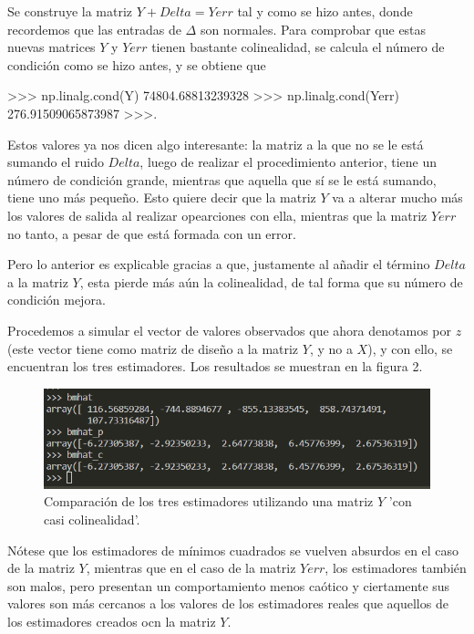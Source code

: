 \documentclass[letterpaper]{article}
\newcommand{\1}{\mathds{1}}
\theoremstyle{definition}
\theoremstyle{definition}
\theoremstyle{definition}
\theoremstyle{definition}
\theoremstyle{definition}
\begin{document}
\begin{enumerate}
\begin{enumerate}
            Se construye la matriz $Y+Delta=Yerr$ tal y como se hizo antes, donde recordemos que las entradas
            de $\Delta$ son normales. Para comprobar que estas nuevas matrices $Y$ y $Yerr$ tienen bastante colinealidad, se calcula el número
            de condición como se hizo antes, y se obtiene que
            \begin{verbatim*}
                >>> np.linalg.cond(Y)
74804.68813239328
>>> np.linalg.cond(Yerr)
276.91509065873987
>>>.
            \end{verbatim*}
            Estos valores ya nos dicen algo interesante: la matriz a la que no se le está
            sumando el ruido $Delta$, luego de realizar el procedimiento anterior, 
            tiene un número de condición grande, mientras que aquella que sí se le está sumando, 
            tiene uno más pequeño. Esto quiere decir que la matriz $Y$ va a alterar mucho más los valores
            de salida al realizar opearciones con ella, mientras que la matriz $Yerr$ no tanto, a pesar
            de que está formada con un error.
            \newline

            Pero lo anterior es explicable gracias a que, justamente al añadir el término $Delta$ a 
            la matriz $Y$, esta pierde más aún la colinealidad, de tal forma que su número de condición 
            mejora.
            \newline

            Procedemos a simular el vector de valores observados que ahora denotamos por $z$ (este vector
            tiene como matriz de diseño a la matriz $Y$, y no a $X$), y con ello, se encuentran los tres
            estimadores. Los resultados se muestran en la figura 2.

            \begin{figure}[h]
                \centering
                \includegraphics[width=0.7\linewidth]{1.png}
                \caption{Comparación de los tres estimadores utilizando una matriz $Y$ 'con casi colinealidad'.}
            \end{figure}
            Nótese que los estimadores de mínimos cuadrados se vuelven absurdos en el caso de la matriz $Y$, mientras
            que en el caso de la matriz $Yerr$, los estimadores también son malos, pero presentan un comportamiento
            menos caótico y ciertamente sus valores son  más cercanos a los valores de los estimadores reales
            que aquellos de los estimadores creados ocn la matriz $Y$.\\


\end{enumerate}
\end{enumerate}
\end{document}
